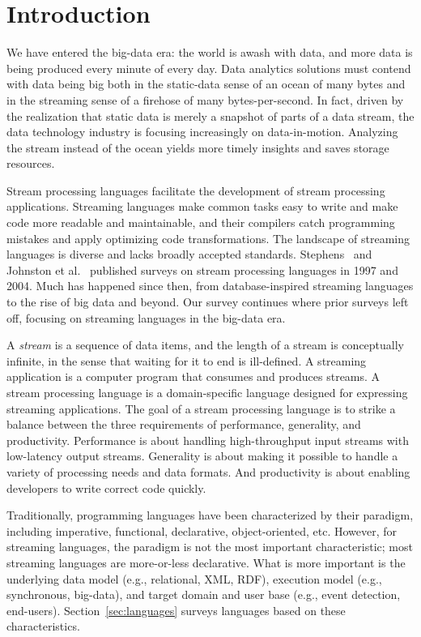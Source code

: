 \section{Introduction}\label{sec:introduction}

We have entered the big-data era: the world is awash with data, and
more data is being produced every minute of every day. Data analytics
solutions must contend with data being big both in the static-data sense of
an ocean of many bytes and in the streaming sense of a firehose of
many bytes-per-second. In fact, driven by the realization that static
data is merely a snapshot of parts of a data stream, the data technology
industry is focusing increasingly on data-in-motion. Analyzing
the stream instead of the ocean yields more timely insights and saves
storage resources.

Stream processing languages facilitate the development of stream
processing applications. Streaming languages make common tasks easy to
write and make code more readable and maintainable, and their
compilers catch programming mistakes and apply optimizing code
transformations. The landscape of streaming languages is diverse and
lacks broadly accepted standards.  Stephens~\cite{stephens_1997} and
Johnston et al.~\cite{johnston_hanna_millar_2004} published surveys on
stream processing languages in 1997 and 2004. Much has happened since
then, from database-inspired streaming languages to the rise of big
data and beyond. Our survey continues where prior surveys left off,
focusing on streaming languages in the big-data era.

A \emph{stream} is a sequence of data items, and the length of a
stream is conceptually infinite, in the sense that waiting for it to
end is ill-defined. A streaming application is a computer program that
consumes and produces streams. A stream processing language is a
domain-specific language designed for expressing streaming
applications. The goal of a stream processing language is to strike a
balance between the three requirements of performance, generality, and
productivity. Performance is about handling high-throughput input
streams with low-latency output streams. Generality is about making it
possible to handle a variety of processing needs and data formats. And
productivity is about enabling developers to write correct code
quickly.

Traditionally, programming languages have been characterized by their
paradigm, including imperative, functional, declarative,
object-oriented, etc. However, for streaming languages, the paradigm
is not the most important characteristic; most streaming languages are
more-or-less declarative. What is more important is the underlying
data model (e.g., relational, XML, RDF), execution model (e.g.,
synchronous, big-data), and target domain and user base (e.g., event
detection, end-users).  Section~\ref{sec:languages} surveys languages
based on these characteristics.

